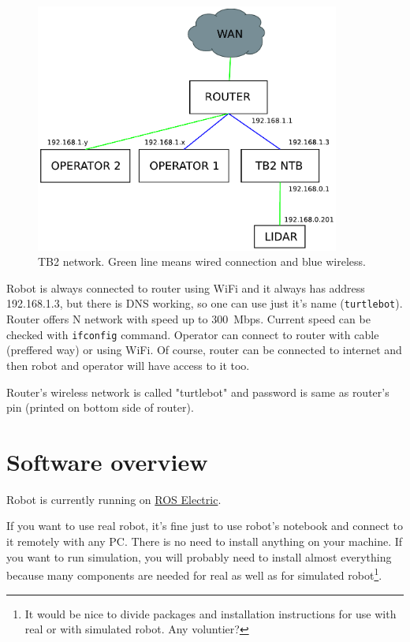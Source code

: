 \documentclass[12pt,a4paper,titlepage]{article}
\numberwithin{equation}{subsection}
\begin{document}
\begin{center}
 \begin{figure}[h]
	\centering\includegraphics[width=10cm]{./img/networking.pdf}
 \caption{TB2 network. Green line means wired connection and blue wireless.}
 \label{fig:tb2-networking}
 \end{figure}
\end{center}

Robot is always connected to router using WiFi and it always has address 192.168.1.3, but there is DNS working, so one can use just it's name (\verb|turtlebot|). Router offers N network with speed up to 300~Mbps. Current speed can be checked with \verb|ifconfig| command. Operator can connect to router with cable (preffered way) or using WiFi. Of course, router can be connected to internet and then robot and operator will have access to it too.

Router's wireless network is called "turtlebot" and password is same as router's pin (printed on bottom side of router).

\section{Software overview}

Robot is currently running on \href{http://ros.org/wiki/electric}{ROS Electric}.

If you want to use real robot, it's fine just to use robot's notebook and connect to it remotely with any PC. There is no need to install anything on your machine. If you want to run simulation, you will probably need to install almost everything because many components are needed for real as well as for simulated robot\footnote{It would be nice to divide packages and installation instructions for use with real or with simulated robot. Any voluntier?}.
\end{document}
